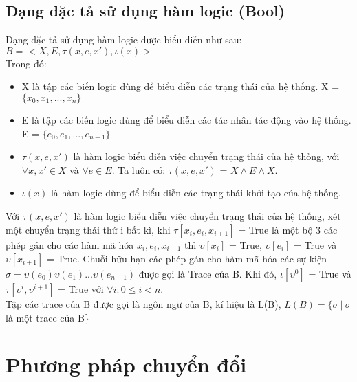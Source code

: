 \documentclass{article}
\begin{document}
\begin{flushleft}
			\subsection{Dạng đặc tả sử dụng hàm logic (Bool)}
			Dạng đặc tả sử dụng hàm logic được biểu diễn như sau: \\
				$B = <X, E, \tau(x, e, x'), \iota(x)>$\\
				Trong đó:\\
				\begin{itemize}
					\item X là tập các biến logic dùng để biểu diễn các trạng thái của hệ thống. X = $\{x_0, x_1, ..., x_n\}$
					\item E là tập các biến logic dùng để biểu diễn các tác nhân tác động vào hệ thống. E = $\{e_0, e_1, ..., e_{n-1}\}$
					\item $\tau(x, e, x')$ là hàm logic biểu diễn việc chuyển trạng thái của hệ thống, với $\forall x, x' \in X$ và $\forall e \in E$. Ta luôn có:
					$\tau(x, e, x')$ = $X \land E \land X$.
					\item $\iota(x)$ là hàm logic dùng để biểu diễn các trạng thái khởi tạo của hệ thống.
				\end{itemize}
				Với $\tau(x, e, x')$ là hàm logic biểu diễn việc chuyển trạng thái của hệ thống, xét một chuyển trạng thái thứ i bất kì, khi $\tau[x_i, e_i, x_{i+1}]$ = True là một bộ 3 các phép gán cho các hàm mã hóa $x_i, e_i, x_{i+1}$ thì $\upsilon[x_i]$ = True, $\upsilon[e_i]$ = True và $\upsilon[x_{i+1}]$ = True. Chuỗi hữu hạn các phép gán cho hàm mã hóa các sự kiện $\sigma = \upsilon(e_0)\upsilon(e_1)...\upsilon(e_{n-1})$ được gọi là Trace của B. Khi đó, $\iota[\upsilon^0]$ = True và $\tau[\upsilon^i, \upsilon^{i+1}]$ = True với $\forall i: 0 \leq i < n$.\\
				Tập các trace của B được gọi là ngôn ngữ của B, kí hiệu là L(B), $L(B) = \{\sigma\ |\ \sigma$ là một trace của B\}\\
		\section{Phương pháp chuyển đổi}

\end{flushleft}
\end{document}
